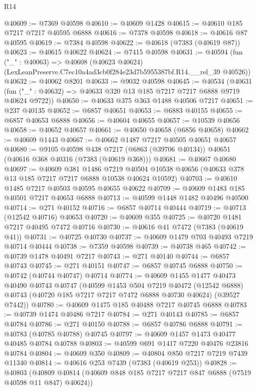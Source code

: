 \begin{lexlean}{R14}
\begin{coremodule}
@40609 := @7369 @40598
@40610 := @40609 @1428
@40615 := @40610 @185 @7217 @7217 @40595 @6888
@40616 := @7378 @40598
@40618 := @40616 @87 @40595
@40619 := @7384 @40598
@40622 := @40618 (@7383 (@40619 @87))
@40623 := @40615 @40622
@40624 := @7415 @40598
@40631 := @40594
    (fun ("_" : @40063) =>
    @40608 (@40623 @40624) (LexLeanPreserve.C7ec10a4ad3cb0f284e23d7b5955387bf.R14.__rel_39 @40526))
@40632 := @40062 @8201
@40633 := @9032 @40598
@40645 := @40534
    (@40631 (fun ("_" : @40632) => @40633 @320 @13 @185 @7217 @7217 @6888 @9719 @40624 @9722))
@40650 := @40633 @375 @363 @1488 @40506 @7217
@40651 := @237 @40135
@40652 := @6857 @40651
@40653 := @6883 @40155
@40655 := @6857 @40653 @6888
@40656 := @40604 @40655
@40657 := @10539 @40656
@40658 := @40652 @40657
@40661 := @40650 @40658 (@6856 @40658)
@40662 := @40609 @1443
@40667 := @40662 @1487 @7217 @40505 @40651 @40657
@40680 := @9105
    @40598
    @438
    @7217
    (@6863 (@39706 @40134))
    @40651
    (@40616 @368 @40316 (@7383 (@40619 @368)))
@40681 := @40667 @40680
@40697 := @40609
    @381
    @1486
    @7219
    @40504
    @10538
    @40656
    (@40633 @378 @13 @185 @7217 @7217 @6888 @10538 @40624 @10592)
@40703 := @40610 @1485 @7217 @40503 @40595 @40655 @40622
@40709 := @40609 @1483 @185 @40501 @7217 @40653 @6888
@40713 := @40599 @1448 @1482 @40496 @40500
@40714 := @271 @40152
@40716 := @6857 @40714 @40444
@40719 := @40713 (@12542 @40716) @40653
@40720 := @40609 @355
@40725 := @40720 @1481 @7217 @40495 @7472 @40716
@40730 := @40616 @41 @7472 (@7383 (@40619 @41))
@40731 := @40725 @40730
@40737 := @40609 @1479 @703 @40493 @7219 @40714 @40444
@40738 := @7359 @40598
@40739 := @40738 @465
@40742 := @40739 @1478 @40491 @7217
@40743 := @271 @40140
@40744 := @6857 @40743
@40745 := @271 @40151
@40747 := @6857 @40745 @6888
@40750 := @40742 (@40744 @40747) @40714
@40774 := @40609
    @1455
    @1477
    @40473
    @40490
    @40743
    @40747
    (@40599
      @1453
      @504
      @7219
      @40472
      (@12542 @6888)
      @40743
      (@40720 @185 @7217 @7217 @7472 @6888 @40730 @40624)
      (@39527 @7442))
@40780 := @40609 @1475 @185 @40488 @7217 @40745 @6888
@40783 := @40739 @1474 @40486 @7217
@40784 := @271 @40143
@40785 := @6857 @40784
@40786 := @271 @40150
@40788 := @6857 @40786 @6888
@40791 := @40783 (@40785 @40788) @40745
@40797 := @40609 @1457 @1473 @40477 @40485 @40784 @40788
@40803 := @40599 @691 @1417 @7220 @40476 @23816 @40784
@40804 := @40609 @350
@40809 := @40804 @850 @7217 @7219 @7439 @11340
@40814 := @40616 @253 @7439 (@7383 (@40619 @253))
@40828 := @40803
    (@40809 @40814 (@40609 @848 @185 @7217 @7217 @847 @6888 (@7519 @40598 @11 @847) @40624))

\end{coremodule}
\end{lexlean}
